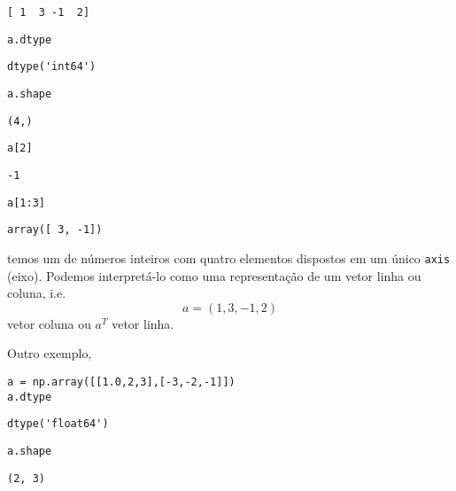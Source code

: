 \documentclass[a4paper,10pt,twoside]{article}
\begin{document}
\begin{verbatim}
[ 1  3 -1  2]
\end{verbatim}

\begin{lstlisting}
a.dtype
\end{lstlisting}

\begin{verbatim}
dtype('int64')
\end{verbatim}

\begin{lstlisting}
a.shape
\end{lstlisting}

\begin{verbatim}
(4,)
\end{verbatim}

\begin{lstlisting}
a[2]
\end{lstlisting}

\begin{verbatim}
-1
\end{verbatim}

\begin{lstlisting}
a[1:3]
\end{lstlisting}

\begin{verbatim}
array([ 3, -1])
\end{verbatim}

temos um {\PYTHONnumpyDOTarray} de números inteiros com quatro elementos dispostos em um único \texttt{axis} (eixo). Podemos interpretá-lo como uma representação de um vetor linha ou coluna, i.e.
\begin{equation}
  a = (1, 3, -1, 2)
\end{equation}
vetor coluna ou $a^T$ vetor linha.

Outro exemplo,

\begin{lstlisting}
a = np.array([[1.0,2,3],[-3,-2,-1]])
a.dtype
\end{lstlisting}

\begin{verbatim}
dtype('float64')
\end{verbatim}

\begin{lstlisting}
a.shape
\end{lstlisting}

\begin{verbatim}
(2, 3)
\end{verbatim}
\end{document}
